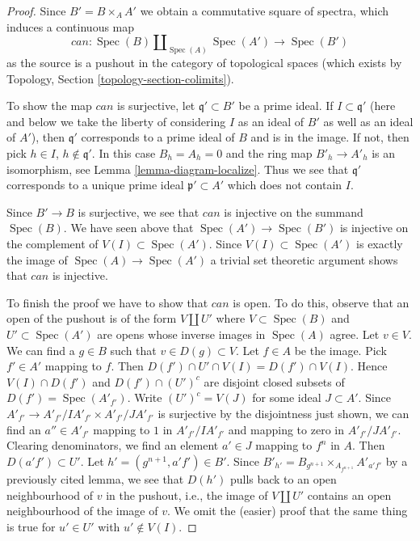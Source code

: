 \documentclass[10pt,a4paper]{amsart}
\theoremstyle{plain}
\theoremstyle{definition}
\theoremstyle{remark}
\numberwithin{equation}{subsection}
\def\Spec{\mathop{\mathrm{Spec}}}
\begin{document}
\begin{proof}
Since $B' = B \times_A A'$ we obtain a commutative square of
spectra, which induces a continuous map
$$
can : \Spec(B) \amalg_{\Spec(A)} \Spec(A') \longrightarrow \Spec(B')
$$
as the source is a pushout in the category
of topological spaces (which exists by
Topology, Section \ref{topology-section-colimits}).

\medskip\noindent
To show the map $can$ is surjective, let $\mathfrak q' \subset B'$ be a prime
ideal. If $I \subset \mathfrak q'$ (here and below we take the liberty
of considering $I$ as an ideal of $B'$ as well as an ideal of $A'$),
then $\mathfrak q'$ corresponds to a prime ideal of $B$ and is in the image.
If not, then pick $h \in I$, $h \not \in \mathfrak q'$.
In this case $B_h = A_h = 0$
and the ring map $B'_h \to A'_h$ is an isomorphism, see
Lemma \ref{lemma-diagram-localize}. Thus we see that
$\mathfrak q'$ corresponds to a unique prime ideal $\mathfrak p' \subset A'$
which does not contain $I$.

\medskip\noindent
Since $B' \to B$ is surjective, we see that $can$ is injective on
the summand $\Spec(B)$. We have seen above that $\Spec(A') \to \Spec(B')$
is injective on the complement of $V(I) \subset \Spec(A')$. Since
$V(I) \subset \Spec(A')$ is exactly the image of $\Spec(A) \to \Spec(A')$
a trivial set theoretic argument shows that $can$ is injective.

\medskip\noindent
To finish the proof we have to show that $can$ is open. To do this, observe
that an open of the pushout is of the form $V \amalg U'$ where
$V \subset \Spec(B)$ and $U' \subset \Spec(A')$ are opens whose inverse
images in $\Spec(A)$ agree. Let $v \in V$. We can find a $g \in B$
such that $v \in D(g) \subset V$. Let $f \in A$ be the image.
Pick $f' \in A'$ mapping to $f$. Then
$D(f') \cap U' \cap V(I) = D(f') \cap V(I)$.
Hence $V(I) \cap D(f')$ and $D(f') \cap (U')^c$ are disjoint closed
subsets of $D(f') = \Spec(A'_{f'})$. Write $(U')^c = V(J)$
for some ideal $J \subset A'$. Since
$A'_{f'} \to A'_{f'}/IA'_{f'} \times A'_{f'}/JA'_{f'}$
is surjective by the disjointness just shown, we can find an $a'' \in A'_{f'}$
mapping to $1$ in $A'_{f'}/IA'_{f'}$ and mapping to zero in
$A'_{f'}/JA'_{f'}$. Clearing denominators, we find an element
$a' \in J$ mapping to $f^n$ in $A$. Then $D(a'f') \subset U'$.
Let $h' = (g^{n + 1}, a'f') \in B'$.
Since $B'_{h'} = B_{g^{n + 1}} \times_{A_{f^{n + 1}}} A'_{a'f'}$ by a previously
cited lemma, we see that $D(h')$ pulls back to an open neighbourhood
of $v$ in the pushout, i.e., the image of $V \amalg U'$ contains
an open neighbourhood of the image of $v$. We omit the (easier) proof that
the same thing is true for $u' \in U'$ with $u' \not \in V(I)$.
\end{proof}
\end{document}
